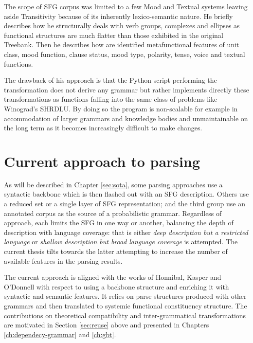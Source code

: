 The scope of SFG corpus was limited to a few Mood and Textual systems leaving aside Transitivity because of its inherently lexico-semantic nature. He briefly describes how he structurally deals with verb groups, complexes and ellipses as functional structures are much flatter than those exhibited in the original Treebank. Then he describes how are identified metafunctional features of unit class, mood function, clause status, mood type, polarity, tense, voice and textual functions.

The drawback of his approach is that the Python script performing the transformation does not derive any grammar but rather implements directly these transformations as functions falling into the same class of problems like Winograd's SHRDLU. By doing so the program is non-scalable for example in accommodation of larger grammars and knowledge bodies and unmaintainable on the long term as it becomes increasingly difficult to make changes. 


\section{Current approach to parsing}


As will be described in Chapter \ref{sec:sota}, some parsing approaches use a syntactic backbone which is then flashed out with an SFG description. Others use a reduced set or a single layer of SFG representation; and the third group use an annotated corpus as the source of a probabilistic grammar. Regardless of approach, each limits the SFG in one way or another, balancing the depth of description with language coverage: that is either \textit{deep description but a restricted language} or \textit{shallow description but broad language coverage} is attempted. The current thesis tilts towards the latter attempting to increase the number of available features in the parsing results. 

The current approach is aligned with the works of Honnibal, Kasper and O'Donnell with respect to using a backbone structure and enriching it with syntactic and semantic features. It relies on parse structures produced with other grammars and then translated to systemic functional constituency structure. The contributions on theoretical compatibility and inter-grammatical transformations are motivated in Section \ref{sec:reuse} above and presented in Chapters \ref{ch:dependecy-grammar} and \ref{ch:gbt}. 

